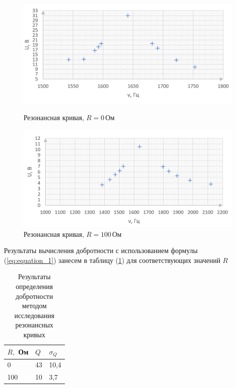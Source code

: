 \documentclass[10pt,a4paper]{article}
\begin{document}
	\begin{figure}[h!]
		\begin{minipage}{0.49\textwidth}
			\hspace{-0.5cm}
			\includegraphics[width = 1.1\textwidth]{GraphR0.png}
			\caption{Резонансная кривая, $R = 0\,$Ом}
			\label{fig:graph_of_depence_amplitude_R=0}
		\end{minipage}
		\hfill
		\begin{minipage}{0.49\textwidth}
			\hspace{-0.5cm}
			\includegraphics[width = 1.1\textwidth]{GraphR100.png}
			\caption{Резонансная кривая, $R = 100\,$Ом}
			\label{fig:graph_of_depence_amplitude_R=100}
		\end{minipage}
	\end{figure}
    
    Результаты вычисления добротности с использованием формулы (\ref{eq:equation_1}) занесем в таблицу (\ref{tab:Q_from_resonance_curve}) для соответствующих значений $R$
	
	\begin{table}[h!]
\centering
\begin{tabular}{|l|l|l|}
\hline
$R,$ Ом & $Q$ & $\sigma_{Q}$ \\ \hline
0       & 43           & 10,4                      \\ \hline
100     & 10           & 3,7                       \\ \hline
\end{tabular}
\caption{Результаты определения добротности методом исследования резонансных кривых}
\label{tab:Q_from_resonance_curve}
\end{table}
	
\end{document}
